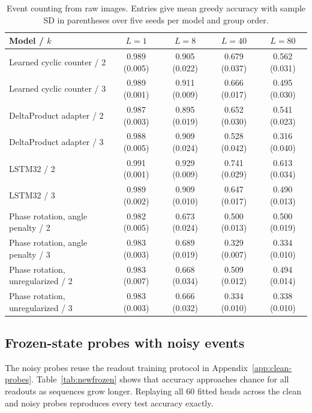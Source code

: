 \begin{table}[H]
\centering\small
\caption{Event counting from raw images. Entries give mean greedy accuracy with sample
SD in parentheses over five seeds per model and group order.}
\label{tab:newvision}
\setlength{\tabcolsep}{3pt}
\begin{tabular}{lcccc}
\toprule
Model / $k$ & $L=1$ & $L=8$ & $L=40$ & $L=80$ \\
\midrule
Learned cyclic counter / 2 & 0.989 (0.005) & 0.905 (0.022) & 0.679 (0.037) & 0.562 (0.031) \\
Learned cyclic counter / 3 & 0.989 (0.001) & 0.911 (0.009) & 0.666 (0.017) & 0.495 (0.030) \\
DeltaProduct adapter / 2 & 0.987 (0.003) & 0.895 (0.019) & 0.652 (0.030) & 0.541 (0.023) \\
DeltaProduct adapter / 3 & 0.988 (0.005) & 0.909 (0.024) & 0.528 (0.042) & 0.316 (0.040) \\
LSTM32 / 2 & 0.991 (0.001) & 0.929 (0.009) & 0.741 (0.029) & 0.613 (0.034) \\
LSTM32 / 3 & 0.989 (0.002) & 0.909 (0.010) & 0.647 (0.017) & 0.490 (0.013) \\
Phase rotation, angle penalty / 2 & 0.982 (0.005) & 0.673 (0.024) & 0.500 (0.013) & 0.500 (0.019) \\
Phase rotation, angle penalty / 3 & 0.983 (0.003) & 0.689 (0.019) & 0.329 (0.007) & 0.334 (0.010) \\
Phase rotation, unregularized / 2 & 0.983 (0.007) & 0.668 (0.034) & 0.509 (0.012) & 0.494 (0.014) \\
Phase rotation, unregularized / 3 & 0.983 (0.003) & 0.666 (0.032) & 0.334 (0.010) & 0.338 (0.010) \\
\bottomrule
\end{tabular}
\end{table}

\subsection{Frozen-state probes with noisy events}
The noisy probes reuse the readout training protocol in
Appendix~\ref{app:clean-probes}. Table~\ref{tab:newfrozen} shows that accuracy
approaches chance for all readouts as sequences grow longer. Replaying all
60 fitted heads across the clean and noisy probes reproduces every test
accuracy exactly.

